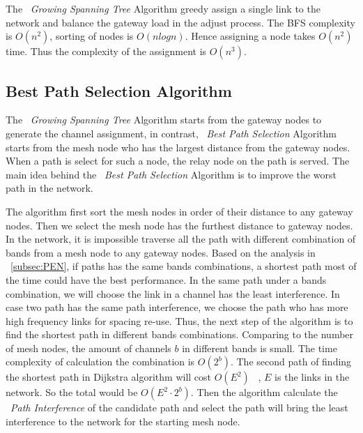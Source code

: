 The ~\emph{Growing Spanning Tree} Algorithm greedy assign a single link to the network and balance the gateway load in the adjust process. The BFS complexity is $O(n^2)$, sorting of nodes is $O(nlogn)$. Hence assigning a node takes $O(n^2)$ time. Thus the complexity of the assignment is $O(n^3)$.









\subsection{Best Path Selection Algorithm}
\label{subsec:step}

The ~\emph{Growing Spanning Tree} Algorithm starts from the gateway nodes to generate the channel assignment, in contrast, ~\emph{Best Path Selection} Algorithm starts from the mesh node who has the largest distance from the gateway nodes.
When a path is select for such a node, the relay node on the path is served. 
The main idea behind the ~\emph{Best Path Selection} Algorithm is to improve the worst path in the network. 

The algorithm first sort the mesh nodes in order of their distance to any gateway nodes. Then we select the mesh node has the furthest distance to gateway nodes. In the network, it is impossible traverse all the path with different combination of bands from a mesh node to any gateway nodes. Based on the analysis in ~\ref{subsec:PEN}, if paths has the same bands combinations, a shortest path most of the time could have the best performance.
In the same path under a bands combination, we will choose the link in a channel has the least interference.
 In case two path has the same path interference, we choose the path who has more high frequency links for spacing re-use.
Thus, the next step of the algorithm is to find the shortest path in different bands combinations. Comparing to the number of mesh nodes, the amount of channels $b$ in different bands is small. The time complexity of calculation the combination is $O(2^b)$. 
The second path of finding the shortest path in Dijkstra algorithm will cost $O(E^2)$ ~\cite{golden1976shortest}, $E$ is the links in the network. So the total would be $O(E^2\cdot 2^b)$.
Then the algorithm calculate the ~\emph{Path Interference} of the candidate path and select the path will bring the least interference to the network for the starting mesh node.

